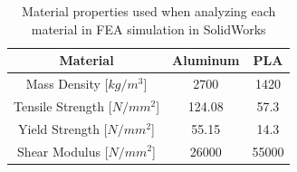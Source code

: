 \begin{table}
    \centering
    \begin{tabular}{ |c|c|c| }
        \hline
        Material & Aluminum & PLA \\
        \hline \hline
        Mass Density [$kg/m^3$] & 2700 & 1420 \\
        \hline
        Tensile Strength [$N/mm^2$] & 124.08 & 57.3\\
        \hline
        Yield Strength [$N/mm^2$] & 55.15 & 14.3\\ 
        \hline
        Shear Modulus [$N/mm^2$] & 26000 & 55000\\
        \hline
    \end{tabular}
    \caption{Material properties used when analyzing each material in FEA simulation in SolidWorks}
    \label{table:MaterialProperties}
\end{table}

